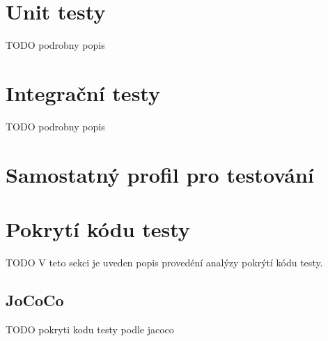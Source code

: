 \section{Unit testy}\label{testovani:unit}
    TODO podrobny popis
\section{Integrační testy}\label{testovani:intergacni}
    TODO podrobny popis
\section{Samostatný profil pro testování}
\section{Pokrytí kódu testy}\label{testovani:pokryti}
    TODO V teto sekci je uveden popis provedéní analýzy pokrýtí kódu testy.
    \subsection{JoCoCo}
    TODO pokryti kodu testy podle jacoco
    \cite{JoCoCo}
